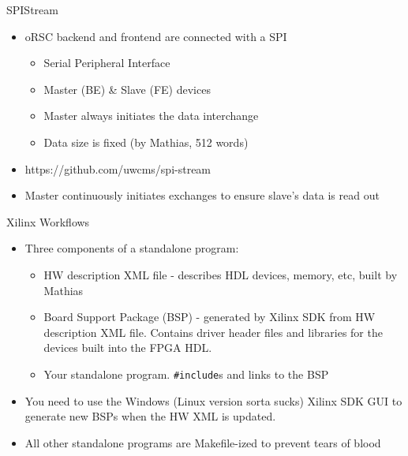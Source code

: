 \documentclass{beamer}
\begin{document}
\begin{frame}{SPIStream}
\begin{itemize}
\item oRSC backend and frontend are connected with a SPI
\begin{itemize}
\item Serial Peripheral Interface
\item Master (BE) \& Slave (FE) devices
\item Master always initiates the data interchange
\item Data size is fixed (by Mathias, 512 words)
\end{itemize}
\item https://github.com/uwcms/spi-stream
\item Master continuously initiates exchanges to ensure slave's data is read out 
\end{itemize}
\end{frame}

\begin{frame}{Xilinx Workflows}
\begin{itemize}
\item Three components of a standalone program:
\begin{itemize}
\item HW description XML file - describes HDL devices, memory, etc, built by Mathias
\item Board Support Package (BSP) - generated by Xilinx SDK from HW description XML file. Contains driver header files and libraries for the devices built into the FPGA HDL.
\item Your standalone program. {\tt\#include}s and links to the BSP
\end{itemize}
\item You need to use the Windows (Linux version sorta sucks) Xilinx SDK GUI to generate new BSPs when the HW XML is updated.
\item All other standalone programs are Makefile-ized to prevent tears of blood
\end{itemize}
\end{frame}
\end{document}
